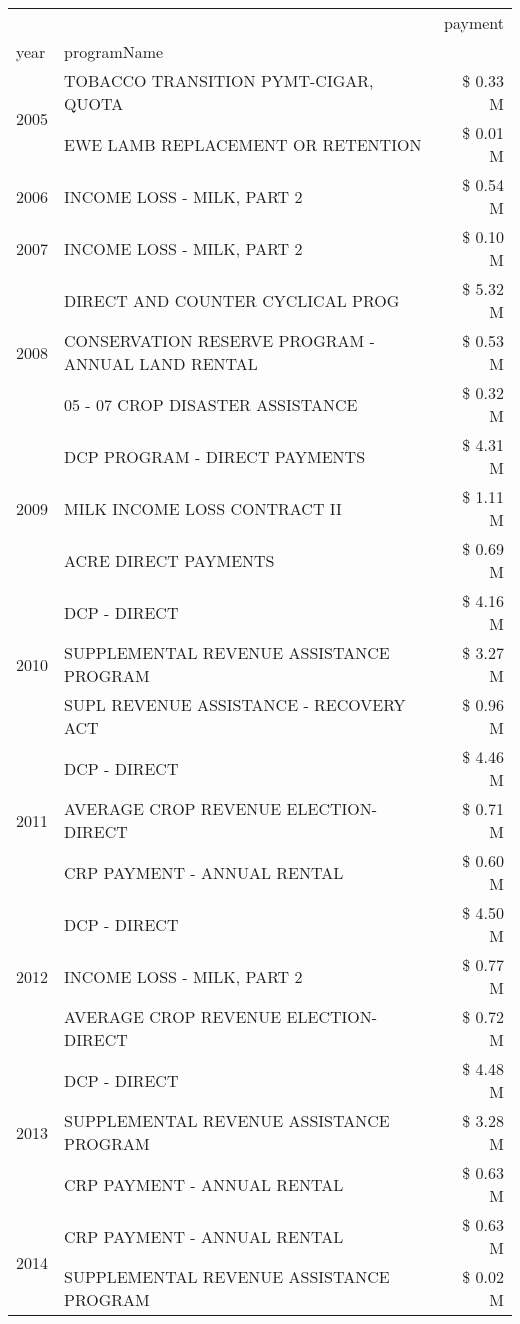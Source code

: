\begin{tabular}{llr}
\toprule
 &  & payment \\
year & programName &  \\
\midrule
\multirow[t]{2}{*}{2005} & TOBACCO TRANSITION PYMT-CIGAR, QUOTA & \$ 0.33 M \\
 & EWE LAMB REPLACEMENT OR RETENTION & \$ 0.01 M \\
\cline{1-3}
2006 & INCOME LOSS - MILK, PART 2 & \$ 0.54 M \\
\cline{1-3}
2007 & INCOME LOSS - MILK, PART 2 & \$ 0.10 M \\
\cline{1-3}
\multirow[t]{3}{*}{2008} & DIRECT AND COUNTER CYCLICAL PROG & \$ 5.32 M \\
 & CONSERVATION RESERVE PROGRAM - ANNUAL LAND RENTAL & \$ 0.53 M \\
 & 05 - 07 CROP DISASTER ASSISTANCE & \$ 0.32 M \\
\cline{1-3}
\multirow[t]{3}{*}{2009} & DCP PROGRAM - DIRECT PAYMENTS & \$ 4.31 M \\
 & MILK INCOME LOSS CONTRACT II & \$ 1.11 M \\
 & ACRE DIRECT PAYMENTS & \$ 0.69 M \\
\cline{1-3}
\multirow[t]{3}{*}{2010} & DCP - DIRECT & \$ 4.16 M \\
 & SUPPLEMENTAL REVENUE ASSISTANCE PROGRAM & \$ 3.27 M \\
 & SUPL REVENUE ASSISTANCE - RECOVERY ACT & \$ 0.96 M \\
\cline{1-3}
\multirow[t]{3}{*}{2011} & DCP - DIRECT & \$ 4.46 M \\
 & AVERAGE CROP REVENUE ELECTION-DIRECT & \$ 0.71 M \\
 & CRP PAYMENT - ANNUAL RENTAL & \$ 0.60 M \\
\cline{1-3}
\multirow[t]{3}{*}{2012} & DCP - DIRECT & \$ 4.50 M \\
 & INCOME LOSS - MILK, PART 2 & \$ 0.77 M \\
 & AVERAGE CROP REVENUE ELECTION-DIRECT & \$ 0.72 M \\
\cline{1-3}
\multirow[t]{3}{*}{2013} & DCP - DIRECT & \$ 4.48 M \\
 & SUPPLEMENTAL REVENUE ASSISTANCE PROGRAM & \$ 3.28 M \\
 & CRP PAYMENT - ANNUAL RENTAL & \$ 0.63 M \\
\cline{1-3}
\multirow[t]{3}{*}{2014} & CRP PAYMENT - ANNUAL RENTAL & \$ 0.63 M \\
 & SUPPLEMENTAL REVENUE ASSISTANCE PROGRAM & \$ 0.02 M \\

\end{tabular}
